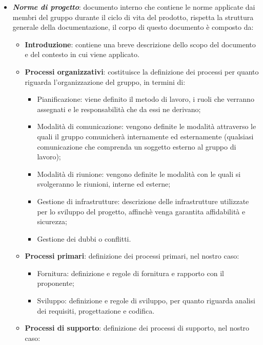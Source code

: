 \begin{itemize}
        \item \textit{\textbf{Norme di progetto}}: documento interno che contiene le norme applicate dai membri del gruppo durante il ciclo di vita del prodotto, rispetta la struttura generale della documentazione, il corpo di questo documento è composto da:
        \begin{itemize}
            \item \textbf{Introduzione}: contiene una breve descrizione dello scopo del documento e del contesto in cui viene applicato.
            \item \textbf{Processi organizzativi}: costituisce la definizione dei processi per quanto riguarda l'organizzazione del gruppo, in termini di:
            \begin{itemize}
                \item Pianificazione: viene definito il metodo di lavoro, i ruoli che verranno assegnati e le responsabilità che da essi ne derivano;
                \item Modalità di comunicazione: vengono definite le modalità attraverso le quali il gruppo comunicherà internamente ed esternamente (qualsiasi comunicazione che comprenda un soggetto esterno al gruppo di lavoro);
                \item Modalità di riunione: vengono definite le modalità con le quali si svolgeranno le riunioni, interne ed esterne;
                \item Gestione di infrastrutture: descrizione delle infrastrutture utilizzate per lo sviluppo del progetto, affinchè venga garantita affidabilità e sicurezza;
                \item Gestione dei dubbi o conflitti.
            \end{itemize}
            \item \textbf{Processi primari}: definizione dei processi primari, nel nostro caso:
            \begin{itemize}
                \item Fornitura: definizione e regole di fornitura e rapporto con il proponente;
                \item Sviluppo: definizione e regole di sviluppo, per quanto riguarda analisi dei requisiti, progettazione e codifica.
            \end{itemize}
            \item \textbf{Processi di supporto}: definizione dei processi di supporto, nel nostro caso:
            \begin{itemize}

\end{itemize}
\end{itemize}
\end{itemize}
